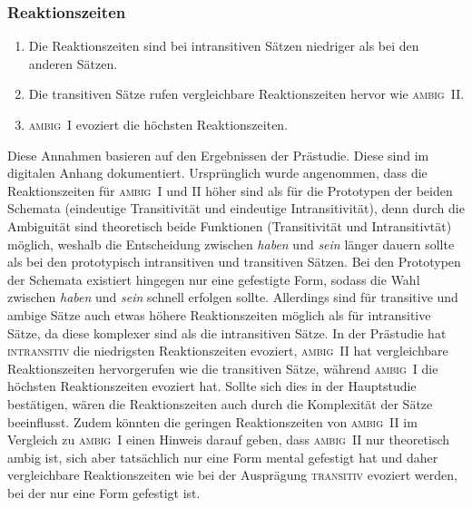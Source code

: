 \subsubsection{Reaktionszeiten}

\begin{enumerate}
\item Die Reaktionszeiten sind bei intransitiven Sätzen niedriger als bei den anderen Sätzen. 
\item Die transitiven Sätze rufen vergleichbare Reaktionszeiten hervor wie \textsc{ambig~II}.
\item \textsc{ambig~I} evoziert die höchsten Reaktionszeiten.
\end{enumerate}
 
Diese Annahmen basieren auf den Ergebnissen der Prästudie. Diese sind im digitalen Anhang dokumentiert.  Ursprünglich wurde angenommen, dass die Reaktionszeiten für \textsc{ambig~I} und \textsc{II}  höher sind als für die Prototypen der beiden Schemata (eindeutige Transitivität und eindeutige Intransitivität), denn durch die Ambiguität sind theoretisch beide Funktionen (Transitivität und Intransitivtät) möglich, weshalb die Entscheidung zwischen \textit{haben} und \textit{sein} länger dauern sollte als bei den prototypisch intransitiven und transitiven Sätzen. Bei den Prototypen der Schemata existiert hingegen nur eine gefestigte Form, sodass die Wahl zwischen \textit{haben} und \textit{sein} schnell erfolgen sollte. Allerdings sind für transitive und ambige Sätze auch etwas höhere Reaktionszeiten möglich als für intransitive Sätze, da diese komplexer sind als die intransitiven Sätze. In der Prästudie hat \textsc{intransitiv} die niedrigsten Reaktionszeiten evoziert, \textsc{ambig~II} hat vergleichbare Reaktionszeiten hervorgerufen wie die transitiven Sätze, während \textsc{ambig~I} die höchsten Reaktionszeiten evoziert hat. Sollte sich dies in der Hauptstudie bestätigen, wären die Reaktionszeiten auch durch die Komplexität der Sätze beeinflusst. Zudem könnten die geringen Reaktionszeiten von \textsc{ambig~II} im Vergleich zu \textsc{ambig~I} einen Hinweis darauf geben, dass \textsc{ambig~II} nur theoretisch ambig ist, sich aber tatsächlich nur eine Form mental gefestigt hat und daher vergleichbare Reaktionszeiten wie bei der Ausprägung \textsc{transitiv} evoziert werden, bei der nur eine Form gefestigt ist.

